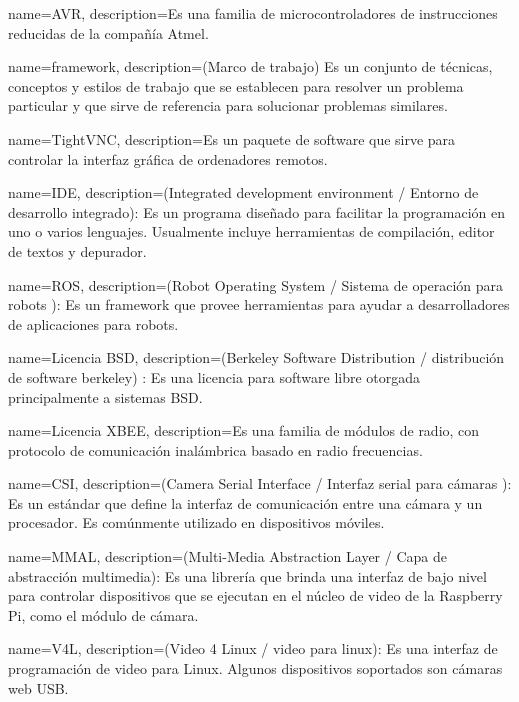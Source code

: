 
{
  name=AVR,
  description={Es una familia de microcontroladores de instrucciones reducidas de la compañía Atmel.}
}

{
  name=framework,
  description={(Marco de trabajo) Es un conjunto de técnicas, conceptos y estilos de trabajo que se establecen para resolver un problema particular y que sirve de referencia para solucionar problemas similares.}
}

{
  name=TightVNC,
  description={Es un paquete de software que sirve para controlar la interfaz gráfica  de ordenadores remotos.}
}

{
  name=IDE,
  description={(Integrated development environment / Entorno de desarrollo integrado): Es un programa diseñado para facilitar la programación en uno o varios lenguajes. Usualmente incluye herramientas de compilación, editor de textos y depurador.}
}

{
  name=ROS,
  description={(Robot Operating System / Sistema de operación para robots ): Es un framework que provee herramientas para ayudar a desarrolladores de aplicaciones para robots.}
}

{
  name=Licencia BSD,
  description={(Berkeley Software Distribution / distribución de software berkeley) : Es una licencia para software libre otorgada principalmente a sistemas BSD.}
}

{
  name=Licencia XBEE,
  description={Es una familia de módulos de radio, con protocolo de comunicación inalámbrica basado en radio frecuencias.}
}

{
  name=CSI,
  description={(Camera Serial Interface / Interfaz serial para cámaras ): Es un estándar que define la interfaz de comunicación entre una cámara y un procesador. Es comúnmente utilizado en dispositivos móviles.}
}
     
{
  name=MMAL,
  description={(Multi-Media Abstraction Layer / Capa de abstracción multimedia): Es una librería que brinda una interfaz de bajo nivel para controlar dispositivos que se ejecutan en el núcleo de video de la Raspberry Pi, como el módulo de cámara.}
}
 
{
  name=V4L,
  description={(Video 4 Linux / video para linux): Es una interfaz de programación de video para Linux. Algunos dispositivos soportados son cámaras web USB.}
}

